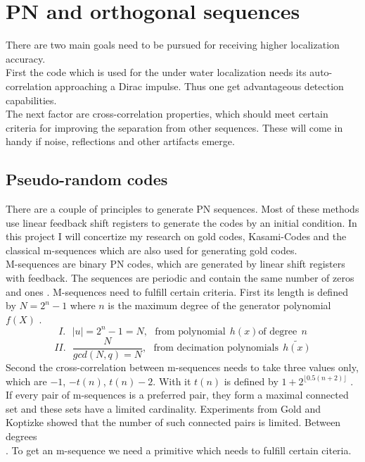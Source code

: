 \chapter{PN and orthogonal sequences}

There are two main goals need to be pursued for receiving higher localization accuracy.\\    
First the code which is used for the under water localization needs its auto-correlation approaching a Dirac impulse. Thus one get advantageous detection capabilities.\\
The next factor are cross-correlation properties, which should meet certain criteria for improving the separation from other sequences. These will come in handy if noise, reflections and other artifacts emerge.

\section{Pseudo-random codes}

There are a couple of principles to generate PN sequences. Most of these methods use linear feedback shift registers to generate the codes by an initial condition. In this project I will concertize my research on gold codes, Kasami-Codes and the classical m-sequences which are also used for generating gold codes.\\
M-sequences are binary PN codes, which are generated by linear shift registers with feedback. The sequences are periodic and contain the same number of zeros and ones \cite{proakis08}. 
M-sequences need to fulfill certain criteria.  First its length is defined by $N=2^n - 1$ where $n$ is the maximum degree of the generator polynomial $f(X)$ \cite{sarwate80}.
 \begin{equation}
	I.~~~ \lvert u\rvert=2^n-1=N,~~~\text{from polynomial}~~h(x) \text{of degree}~~n
\end{equation}
\begin{equation}
	II.~~~\dfrac{N}{gcd(N,q)=N},~~~\text{from decimation polynomials}~~\widetilde{h(x)}
\end{equation}
Second the cross-correlation between m-sequences needs to take three values only, which are $-1$, $-t(n)$, $t(n) - 2$. With it $t(n)$ is defined by $1+2^{\lfloor0.5(n+2)\rfloor}$ \cite{sarwate80}.
If every pair of m-sequences is a preferred pair, they form a maximal connected set and these sets have a limited cardinality. Experiments from Gold and Koptizke showed that the number of such connected pairs is limited. Between degrees $$$$ \cite{gold65}. To get an m-sequence we need a primitive which needs to fulfill certain citeria. 


